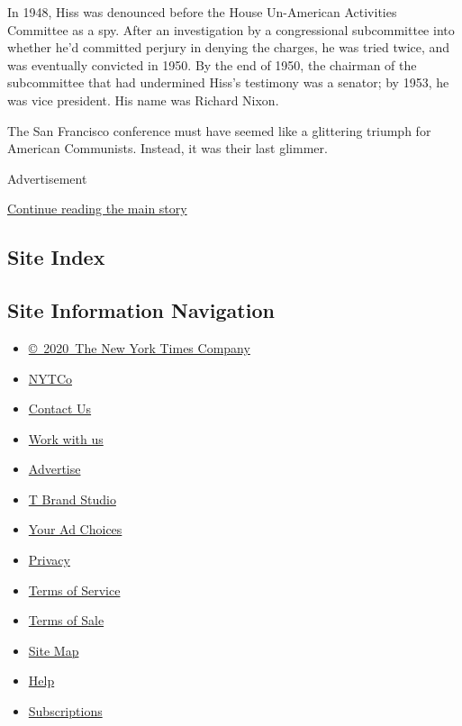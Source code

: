 In 1948, Hiss was denounced before the House Un-American Activities
Committee as a spy. After an investigation by a congressional
subcommittee into whether he'd committed perjury in denying the charges,
he was tried twice, and was eventually convicted in 1950. By the end of
1950, the chairman of the subcommittee that had undermined Hiss's
testimony was a senator; by 1953, he was vice president. His name was
Richard Nixon.

The San Francisco conference must have seemed like a glittering triumph
for American Communists. Instead, it was their last glimmer.

Advertisement

\protect\hyperlink{after-bottom}{Continue reading the main story}

\hypertarget{site-index}{%
\subsection{Site Index}\label{site-index}}

\hypertarget{site-information-navigation}{%
\subsection{Site Information
Navigation}\label{site-information-navigation}}

\begin{itemize}
\tightlist
\item
  \href{https://help.nytimes3xbfgragh.onion/hc/en-us/articles/115014792127-Copyright-notice}{©~2020~The
  New York Times Company}
\end{itemize}

\begin{itemize}
\tightlist
\item
  \href{https://www.nytco.com/}{NYTCo}
\item
  \href{https://help.nytimes3xbfgragh.onion/hc/en-us/articles/115015385887-Contact-Us}{Contact
  Us}
\item
  \href{https://www.nytco.com/careers/}{Work with us}
\item
  \href{https://nytmediakit.com/}{Advertise}
\item
  \href{http://www.tbrandstudio.com/}{T Brand Studio}
\item
  \href{https://www.nytimes3xbfgragh.onion/privacy/cookie-policy\#how-do-i-manage-trackers}{Your
  Ad Choices}
\item
  \href{https://www.nytimes3xbfgragh.onion/privacy}{Privacy}
\item
  \href{https://help.nytimes3xbfgragh.onion/hc/en-us/articles/115014893428-Terms-of-service}{Terms
  of Service}
\item
  \href{https://help.nytimes3xbfgragh.onion/hc/en-us/articles/115014893968-Terms-of-sale}{Terms
  of Sale}
\item
  \href{https://spiderbites.nytimes3xbfgragh.onion}{Site Map}
\item
  \href{https://help.nytimes3xbfgragh.onion/hc/en-us}{Help}
\item
  \href{https://www.nytimes3xbfgragh.onion/subscription?campaignId=37WXW}{Subscriptions}
\end{itemize}
